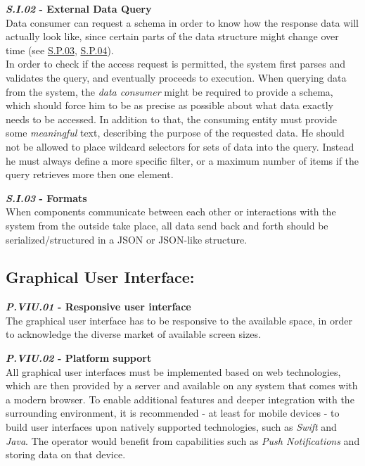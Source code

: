 \documentclass[12pt,english,a4paper,titlepage,cleardoublepage=empty,dottedtoc]{report}
\begin{document}
\textbf{\emph{\protect\hypertarget{si02}{}{S.I.02}} - External Data
Query}\\
Data consumer can request a schema in order to know how the response
data will actually look like, since certain parts of the data structure
might change over time (see \protect\hyperlink{sp03}{S.P.03},
\protect\hyperlink{sp04}{S.P.04}).\\
In order to check if the access request is permitted, the system first
parses and validates the query, and eventually proceeds to execution.
When querying data from the system, the \emph{data consumer} might be
required to provide a schema, which should force him to be as precise as
possible about what data exactly needs to be accessed. In addition to
that, the consuming entity must provide some \emph{meaningful} text,
describing the purpose of the requested data. He should not be allowed
to place wildcard selectors for sets of data into the query. Instead he
must always define a more specific filter, or a maximum number of items
if the query retrieves more then one element.

\textbf{\emph{\protect\hypertarget{si03}{}{S.I.03}} - Formats}\\
When components communicate between each other or interactions with the
system from the outside take place, all data send back and forth should
be serialized/structured in a JSON or JSON-like structure.

\subsection*{Graphical User Interface:}\label{graphical-user-interface}

\textbf{\emph{\protect\hypertarget{pviu01}{}{P.VIU.01}} - Responsive
user interface}\\
The graphical user interface has to be responsive to the available
space, in order to acknowledge the diverse market of available screen
sizes.

\textbf{\emph{\protect\hypertarget{pviu02}{}{P.VIU.02}} - Platform
support}\\
All graphical user interfaces must be implemented based on web
technologies, which are then provided by a server and available on any
system that comes with a modern browser. To enable additional features
and deeper integration with the surrounding environment, it is
recommended - at least for mobile devices - to build user interfaces
upon natively supported technologies, such as \emph{Swift} and
\emph{Java}. The operator would benefit from capabilities such as
\emph{Push Notifications} and storing data on that device.
\end{document}
